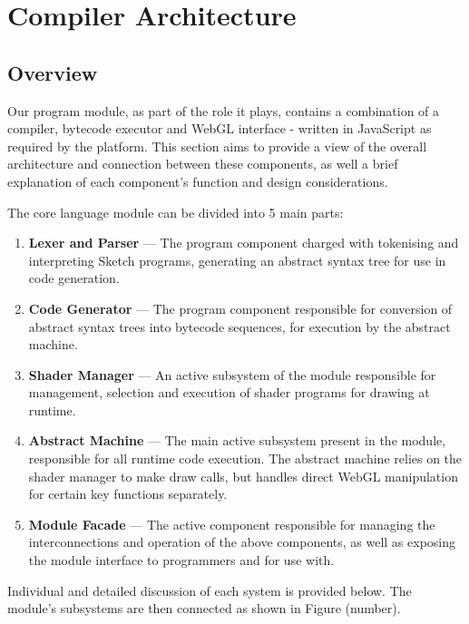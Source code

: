 \documentclass{l3proj}
\begin{document}
\chapter{Compiler Architecture}
\label{arch}

\section{Overview}
\label{arch-over}

Our program module, as part of the role it plays, contains a combination of a compiler, bytecode executor and WebGL interface - written in JavaScript as required by the platform. This section aims to provide a view of the overall architecture and connection between these components, as well a brief explanation of each component's function and design considerations.

The core language module can be divided into 5 main parts:
\begin{enumerate}
\item \textbf{Lexer and Parser} --- The program component charged with tokenising and interpreting Sketch programs, generating an abstract syntax tree for use in code generation.
\item \textbf{Code Generator} --- The program component responsible for conversion of abstract syntax trees into bytecode sequences, for execution by the abstract machine.
\item \textbf{Shader Manager} --- An active subsystem of the module responsible for management, selection and execution of shader programs for drawing at runtime.
\item \textbf{Abstract Machine} --- The main active subsystem present in the module, responsible for all runtime code execution. The abstract machine relies on the shader manager to make draw calls, but handles direct WebGL manipulation for certain key functions separately.
\item \textbf{Module Facade} --- The active component responsible for managing the interconnections and operation of the above components, as well as exposing the module interface to programmers and for use with.
\end{enumerate}
Individual and detailed discussion of each system is provided below. The module's subsystems are then connected as shown in Figure (number).

\end{document}
